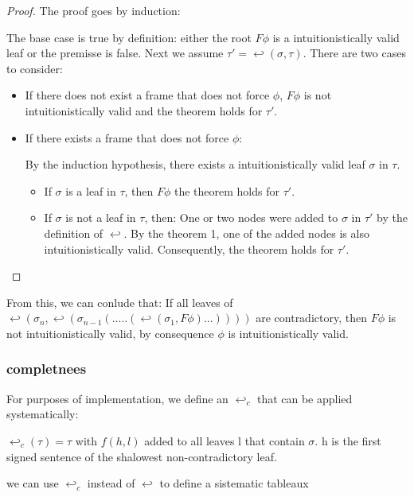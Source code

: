 \documentclass[runningheads]{llncs}
\begin{document}
\begin{proof}

    The proof goes by induction:


             The base case is true by definition: either the root $F\phi$ is a intuitionistically valid leaf or the premisse is false.  Next we assume $\tau' = \hookleftarrow (\sigma, \tau)$.
             There are two cases to consider:
            \begin{itemize}
                \item If there does not exist a frame that does not force $\phi$, $F\phi$ is not intuitionistically valid and the theorem holds for $\tau'$.
                \item  If there exists a frame that does not force $\phi$:

                         By the induction hypothesis, there exists a intuitionistically valid leaf $\sigma$ in $\tau$.
                         \begin{itemize}
                    \item If $\sigma$ is a leaf in $\tau$, then $F\phi$ the theorem holds for $\tau'$.
                    \item If $\sigma$ is not a leaf in $\tau$, then:
                         One or two nodes were added to $\sigma$ in $\tau'$ by the definition of $\hookleftarrow$.
                         By the theorem 1, one of the added nodes is also intuitionistically valid.
                         Consequently, the theorem holds for $\tau'$.

            \end{itemize}
            \end{itemize}
    \end{proof}

    From this, we can conlude that: 
        If all leaves of $ \hookleftarrow (\sigma_n,\hookleftarrow(\sigma_{n-1}(.....(\hookleftarrow(\sigma_1 , F\phi)...)))) $ are contradictory, then $F\phi$ is not intuitionistically valid, by consequence 
        $\phi$ is intuitionistically valid. 



\subsubsection{completnees }

For purposes of implementation, we define an $\hookleftarrow_c$ that can be applied systematically: 
\begin{definition}
     $\hookleftarrow_c(\tau) = \tau$ with $f(h,l)$ added to all leaves l that contain $\sigma$. h is the first signed sentence of the shalowest non-contradictory leaf. 
\end{definition}
we can use $\hookleftarrow_c$ instead of $\hookleftarrow$ to define a sistematic tableaux
\end{document}
